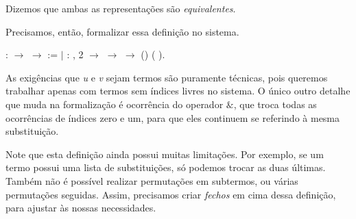 Dizemos que ambas as representações são \emph{equivalentes}.

Precisamos, então, formalizar essa definição no sistema.

\bigskip
\coqdocnoindent
{}  :
 \ensuremath{\rightarrow} 
\ensuremath{\rightarrow}  := \coqdoceol \coqdocindent{1.00em}
\ensuremath{|} :
\coqdockw{\ensuremath{\forall}}   ,
 2  \ensuremath{\rightarrow}
  \ensuremath{\rightarrow}
  \ensuremath{\rightarrow}
(\coqdocnotation{[}\coqdocnotation{][}\coqdocnotation{]})
(\coqdocnotation{(}\coqdocnotation{\&}
\coqdocnotation{)[}\coqdocnotation{][}\coqdocnotation{]}).\coqdoceol
\bigskip

As exigências que \emph{u} e \emph{v} sejam termos são puramente técnicas, pois
queremos trabalhar apenas com termos sem índices livres no sistema. O único
outro detalhe que muda na formalização é ocorrência do operador $\&$, que
troca todas as ocorrências de índices zero e um, para que eles continuem se
referindo à mesma substituição.

Note que esta definição ainda possui muitas limitações. Por exemplo, se um termo
possui uma lista de substituições, só podemos trocar as duas últimas. Também não
é possível realizar permutações em subtermos, ou várias permutações seguidas.
Assim, precisamos criar \emph{fechos} em cima dessa definição, para ajustar às
nossas necessidades. 


